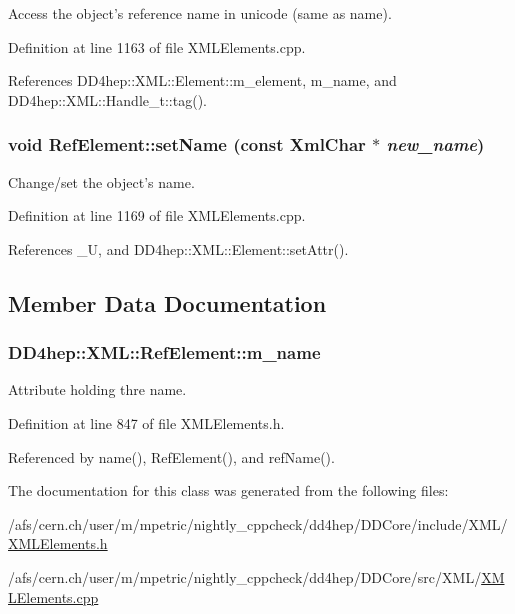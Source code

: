 Access the object's reference name in unicode (same as name). 

Definition at line 1163 of file XMLElements.cpp.

References DD4hep::XML::Element::m\_\-element, m\_\-name, and DD4hep::XML::Handle\_\-t::tag().\hypertarget{class_d_d4hep_1_1_x_m_l_1_1_ref_element_ab466a91b8e0dd13e48ae8a74662b92d5}{
\subsubsection[{setName}]{\setlength{\rightskip}{0pt plus 5cm}void RefElement::setName (const {\bf XmlChar} $\ast$ {\em new\_\-name})}}
\label{class_d_d4hep_1_1_x_m_l_1_1_ref_element_ab466a91b8e0dd13e48ae8a74662b92d5}


Change/set the object's name. 

Definition at line 1169 of file XMLElements.cpp.

References \_\-U, and DD4hep::XML::Element::setAttr().

\subsection{Member Data Documentation}
\hypertarget{class_d_d4hep_1_1_x_m_l_1_1_ref_element_a581df5a2c94d0c6ed1bacce5e478928d}{
\subsubsection[{m\_\-name}]{ {\bf DD4hep::XML::RefElement::m\_\-name}}}
\label{class_d_d4hep_1_1_x_m_l_1_1_ref_element_a581df5a2c94d0c6ed1bacce5e478928d}


Attribute holding thre name. 

Definition at line 847 of file XMLElements.h.

Referenced by name(), RefElement(), and refName().

The documentation for this class was generated from the following files:\begin{DoxyCompactItemize}
\item 
/afs/cern.ch/user/m/mpetric/nightly\_\-cppcheck/dd4hep/DDCore/include/XML/\hyperlink{_x_m_l_elements_8h}{XMLElements.h}\item 
/afs/cern.ch/user/m/mpetric/nightly\_\-cppcheck/dd4hep/DDCore/src/XML/\hyperlink{_x_m_l_elements_8cpp}{XMLElements.cpp}\end{DoxyCompactItemize}
